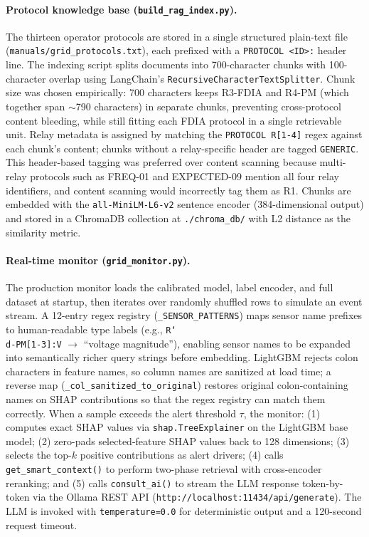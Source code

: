 \documentclass[twocolumn, 10pt, letterpaper]{article}
\begin{document}
\paragraph{Protocol knowledge base (\texttt{build\_rag\_index.py}).}
The thirteen operator protocols are stored in a single structured plain-text
file (\texttt{manuals/grid\_protocols.txt}), each prefixed with a
\texttt{PROTOCOL <ID>:} header line.
The indexing script splits documents into 700-character chunks with
100-character overlap using LangChain's \texttt{RecursiveCharacterTextSplitter}.
Chunk size was chosen empirically: 700 characters keeps R3-FDIA and R4-PM
(which together span $\sim$790 characters) in separate chunks, preventing
cross-protocol content bleeding, while still fitting each FDIA protocol in
a single retrievable unit.
Relay metadata is assigned by matching the \texttt{PROTOCOL R[1-4]} regex
against each chunk's content; chunks without a relay-specific header are
tagged \texttt{GENERIC}.
This header-based tagging was preferred over content scanning because
multi-relay protocols such as FREQ-01 and EXPECTED-09 mention all four relay
identifiers, and content scanning would incorrectly tag them as R1.
Chunks are embedded with the \texttt{all-MiniLM-L6-v2} sentence encoder
(384-dimensional output) and stored in a ChromaDB collection at
\texttt{./chroma\_db/} with L2 distance as the similarity metric.

\paragraph{Real-time monitor (\texttt{grid\_monitor.py}).}
The production monitor loads the calibrated model, label encoder, and full
dataset at startup, then iterates over randomly shuffled rows to simulate
an event stream.
A 12-entry regex registry (\texttt{\_SENSOR\_PATTERNS}) maps sensor name
prefixes to human-readable type labels
(e.g., \texttt{R{\char`\\}d-PM[1-3]:V} $\to$ ``voltage magnitude''),
enabling sensor names to be expanded into semantically richer query strings
before embedding.
LightGBM rejects colon characters in feature names, so column names are
sanitized at load time; a reverse map (\texttt{\_col\_sanitized\_to\_original})
restores original colon-containing names on SHAP contributions so that
the regex registry can match them correctly.
When a sample exceeds the alert threshold $\tau$, the monitor: (1) computes
exact SHAP values via \texttt{shap.TreeExplainer} on the LightGBM base model;
(2) zero-pads selected-feature SHAP values back to 128 dimensions;
(3) selects the top-$k$ positive contributions as alert drivers;
(4) calls \texttt{get\_smart\_context()} to perform two-phase retrieval with
cross-encoder reranking; and (5) calls \texttt{consult\_ai()} to stream the LLM
response token-by-token via the Ollama REST API
(\texttt{http://localhost:11434/api/generate}).
The LLM is invoked with \texttt{temperature=0.0} for deterministic output
and a 120-second request timeout.
\end{document}
